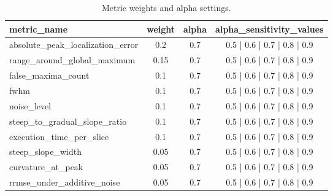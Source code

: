 \begin{table}[t]
\centering
\caption{Metric weights and alpha settings.}
\begin{tabular}{lccc}
\hline
metric_name & weight & alpha & alpha_sensitivity_values \\
\hline
absolute\_peak\_localization\_error & 0.2 & 0.7 & 0.5 | 0.6 | 0.7 | 0.8 | 0.9 \\
range\_around\_global\_maximum & 0.15 & 0.7 & 0.5 | 0.6 | 0.7 | 0.8 | 0.9 \\
false\_maxima\_count & 0.1 & 0.7 & 0.5 | 0.6 | 0.7 | 0.8 | 0.9 \\
fwhm & 0.1 & 0.7 & 0.5 | 0.6 | 0.7 | 0.8 | 0.9 \\
noise\_level & 0.1 & 0.7 & 0.5 | 0.6 | 0.7 | 0.8 | 0.9 \\
steep\_to\_gradual\_slope\_ratio & 0.1 & 0.7 & 0.5 | 0.6 | 0.7 | 0.8 | 0.9 \\
execution\_time\_per\_slice & 0.1 & 0.7 & 0.5 | 0.6 | 0.7 | 0.8 | 0.9 \\
steep\_slope\_width & 0.05 & 0.7 & 0.5 | 0.6 | 0.7 | 0.8 | 0.9 \\
curvature\_at\_peak & 0.05 & 0.7 & 0.5 | 0.6 | 0.7 | 0.8 | 0.9 \\
rrmse\_under\_additive\_noise & 0.05 & 0.7 & 0.5 | 0.6 | 0.7 | 0.8 | 0.9 \\
\hline
\end{tabular}
\end{table}